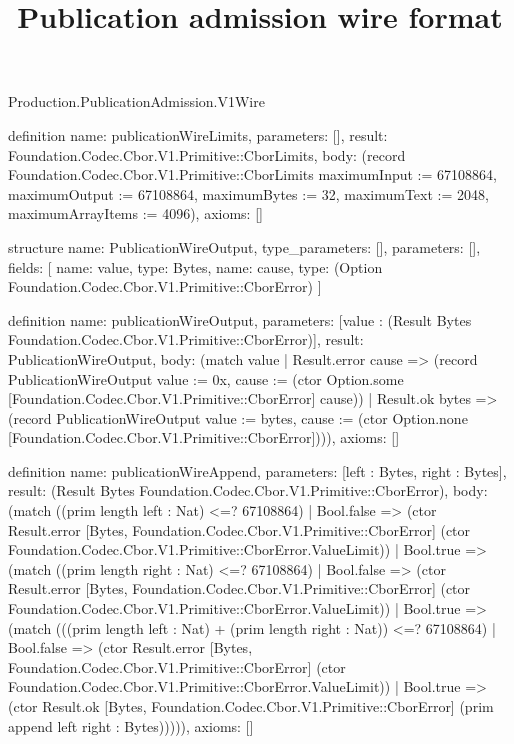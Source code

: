 \begin{lexlean}{Production.PublicationAdmission.V1Wire}
\title{Publication admission wire format}
\begin{semanticmodule}
definition{
  name: publicationWireLimits,
  parameters: [],
  result: Foundation.Codec.Cbor.V1.Primitive::CborLimits,
  body: (record Foundation.Codec.Cbor.V1.Primitive::CborLimits {maximumInput := 67108864, maximumOutput := 67108864, maximumBytes := 32, maximumText := 2048, maximumArrayItems := 4096}),
  axioms: []
}

structure{
  name: PublicationWireOutput,
  type_parameters: [],
  parameters: [],
  fields: [
    {name: value, type: Bytes},
    {name: cause, type: (Option Foundation.Codec.Cbor.V1.Primitive::CborError)}
  ]
}

definition{
  name: publicationWireOutput,
  parameters: [value : (Result Bytes Foundation.Codec.Cbor.V1.Primitive::CborError)],
  result: PublicationWireOutput,
  body: (match value
    | Result.error cause => (record PublicationWireOutput {value := 0x, cause := (ctor Option.some [Foundation.Codec.Cbor.V1.Primitive::CborError] cause)})
    | Result.ok bytes => (record PublicationWireOutput {value := bytes, cause := (ctor Option.none [Foundation.Codec.Cbor.V1.Primitive::CborError])})),
  axioms: []
}

definition{
  name: publicationWireAppend,
  parameters: [left : Bytes, right : Bytes],
  result: (Result Bytes Foundation.Codec.Cbor.V1.Primitive::CborError),
  body: (match ((prim length left : Nat) <=? 67108864)
    | Bool.false => (ctor Result.error [Bytes, Foundation.Codec.Cbor.V1.Primitive::CborError] (ctor Foundation.Codec.Cbor.V1.Primitive::CborError.ValueLimit))
    | Bool.true => (match ((prim length right : Nat) <=? 67108864)
      | Bool.false => (ctor Result.error [Bytes, Foundation.Codec.Cbor.V1.Primitive::CborError] (ctor Foundation.Codec.Cbor.V1.Primitive::CborError.ValueLimit))
      | Bool.true => (match (((prim length left : Nat) + (prim length right : Nat)) <=? 67108864)
        | Bool.false => (ctor Result.error [Bytes, Foundation.Codec.Cbor.V1.Primitive::CborError] (ctor Foundation.Codec.Cbor.V1.Primitive::CborError.ValueLimit))
        | Bool.true => (ctor Result.ok [Bytes, Foundation.Codec.Cbor.V1.Primitive::CborError] (prim append left right : Bytes))))),
  axioms: []
}


\end{semanticmodule}
\end{lexlean}
